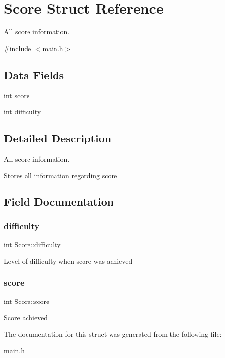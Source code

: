 \hypertarget{struct_score}{}\section{Score Struct Reference}
\label{struct_score}


All score information.  




{\ttfamily \#include $<$main.\+h$>$}

\subsection*{Data Fields}
\begin{DoxyCompactItemize}
\item 
int \hyperlink{struct_score_a331b0927105c83ba760954eff6cf9fe9}{score}
\item 
int \hyperlink{struct_score_af2c37b8548a1fcad347bc9a2afb121e1}{difficulty}
\end{DoxyCompactItemize}


\subsection{Detailed Description}
All score information. 

Stores all information regarding score 

\subsection{Field Documentation}
\mbox{\label{struct_score_af2c37b8548a1fcad347bc9a2afb121e1}} 
\subsubsection{\texorpdfstring{difficulty}{difficulty}}
{\footnotesize\ttfamily int Score\+::difficulty}

Level of difficulty when score was achieved \mbox{\label{struct_score_a331b0927105c83ba760954eff6cf9fe9}} 
\subsubsection{\texorpdfstring{score}{score}}
{\footnotesize\ttfamily int Score\+::score}

\hyperlink{struct_score}{Score} achieved 

The documentation for this struct was generated from the following file\+:\begin{DoxyCompactItemize}
\item 
\hyperlink{main_8h}{main.\+h}\end{DoxyCompactItemize}
